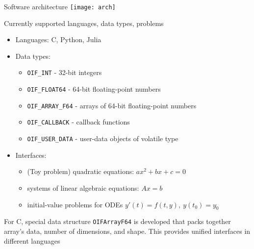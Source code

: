 \documentclass[10pt, aspectratio=169, progressbar=frametitle]{beamer}
\begin{document}
\begin{frame}{Software architecture}
  \centering
  \texttt{[image: arch]}
\end{frame}

\begin{frame}{Currently supported languages, data types, problems}
  \begin{itemize}
    \item Languages: C, Python, Julia
    \item Data types:
          \begin{itemize}
            \item \texttt{OIF\_INT} - 32-bit integers
            \item \texttt{OIF\_FLOAT64} - 64-bit floating-point numbers
            \item \texttt{OIF\_ARRAY\_F64} - arrays of 64-bit floating-point numbers
            \item \texttt{OIF\_CALLBACK} - callback functions
            \item \texttt{OIF\_USER\_DATA} - user-data objects of volatile type
          \end{itemize}
    \item Interfaces:
          \begin{itemize}
            \item (Toy problem) quadratic equations: $ax^2 + bx + c = 0$
            \item systems of linear algebraic equations: $Ax = b$
            \item initial-value problems for ODEs \(y'(t) = f(t, y), \  y(t_0) = y_0\)
          \end{itemize}
  \end{itemize}

  {\small For C, special data structure \texttt{OIFArrayF64} is developed that packs
  together array's data, number of dimensions, and shape.
  This provides unified interfaces in different languages}
\end{frame}
\end{document}
